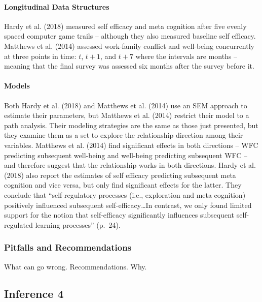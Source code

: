 \documentclass[english,,man]{apa6}
\let\oldparagraph\paragraph
\renewcommand{\paragraph}[1]{\oldparagraph{#1}\mbox{}}
\theoremstyle{definition}
\theoremstyle{definition}
\theoremstyle{definition}
\theoremstyle{remark}
\begin{document}
\hypertarget{longitudinal-data-structures-3}{%
\paragraph{Longitudinal Data
Structures}\label{longitudinal-data-structures-3}}

Hardy et al. (2018) measured self efficacy and meta cognition after five
evenly spaced computer game trails -- although they also measured
baseline self efficacy. Matthews et al. (2014) assessed work-family
conflict and well-being concurrently at three points in time: \(t\),
\(t+1\), and \(t+7\) where the intervals are months -- meaning that the
final survey was assessed six months after the survey before it.

\hypertarget{models-9}{%
\paragraph{Models}\label{models-9}}

Both Hardy et al. (2018) and Matthews et al. (2014) use an SEM approach
to estimate their parameters, but Matthews et al. (2014) restrict their
model to a path analysis. Their modeling strategies are the same as
those just presented, but they examine them as a set to explore the
relationship direction among their variables. Matthews et al. (2014)
find significant effects in both directions -- WFC predicting subsequent
well-being and well-being predicting subsequent WFC -- and therefore
suggest that the relationship works in both directions. Hardy et al.
(2018) also report the estimates of self efficacy predicting subsequent
meta cognition and vice versa, but only find significant effects for the
latter. They conclude that \enquote{self-regulatory processes (i.e.,
exploration and meta cognition) positively influenced subsequent
self-efficacy\ldots{}In contrast, we only found limited support for the
notion that self-efficacy significantly influences subsequent
self-regulated learning processes} (p.~24).

\hypertarget{pitfalls-and-recommendations-9}{%
\subsubsection{Pitfalls and
Recommendations}\label{pitfalls-and-recommendations-9}}

What can go wrong. Recommendations. Why.

\hypertarget{inference-4-1}{%
\subsection{Inference 4}\label{inference-4-1}}
\end{document}
